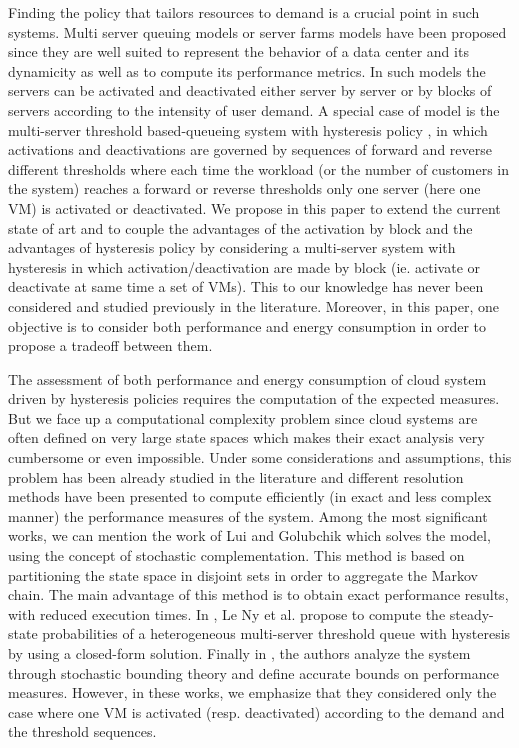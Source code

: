 \documentclass[conference]{IEEEtran}
\begin{document}
Finding the policy that tailors resources to demand is a crucial point in such systems.
Multi server queuing models \cite{Artalejo2005} or server farms models \cite{Gandhi2010,mitrani2013managing} have been proposed
since they are well suited to represent the behavior of a data center and its dynamicity as well as to compute its performance metrics.
In such models the servers can be activated and deactivated either   server by server or by blocks of servers  according to the intensity
of user demand.
A special case of model is the multi-server threshold based-queueing system with hysteresis policy \cite{art:serfozo}, in which activations
and deactivations are governed by sequences of forward and reverse different thresholds
where each time the workload (or the number of customers in the system) reaches a forward or reverse thresholds only one server (here one VM)
is activated or deactivated. We propose in this paper to extend the current state of art and
to couple the advantages of the activation by block and the advantages of hysteresis policy
by considering a multi-server system with hysteresis in which
activation/deactivation are made by block (ie. activate or deactivate at same time a set of VMs).
This to our knowledge has never been considered and studied previously in the literature. Moreover, in this paper,
one objective is to consider both performance and energy consumption in order to propose a tradeoff between them.

The assessment of both performance and  energy consumption of cloud system driven by hysteresis policies requires
the computation of the expected measures. But we face up a computational complexity problem since cloud systems are often defined
on very large state spaces which makes their exact analysis very cumbersome or even impossible.
Under some considerations and assumptions, this problem has been already studied in the literature
and different resolution methods have been presented to compute efficiently (in exact and less complex manner) the performance measures of the system.
Among the most significant works, we can mention the work of Lui and Golubchik \cite{lui1999stochastic} which
solves the model, using the concept of stochastic complementation. This method is based on partitioning the state space
in disjoint sets in order to aggregate the Markov chain.  The main advantage of this method is to obtain exact performance results, with reduced
execution times. In \cite{le2000simple}, Le Ny et al. propose to compute the steady-state probabilities of a heterogeneous multi-server threshold queue
with hysteresis by using a closed-form solution.  Finally in  \cite{ait2016mascots}, the authors analyze the system through stochastic
bounding theory and define accurate bounds on performance measures.
However, in these works, we emphasize that they considered only the case where one VM is activated (resp. deactivated)  according to
the demand and the threshold sequences.
\end{document}
